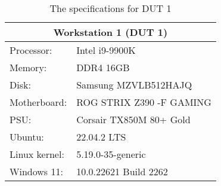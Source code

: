 \begin{table}[H]
    \centering
    \begin{tabular}{|| l | l ||}
    \hline
    \multicolumn{2}{||c||}{Workstation 1 (DUT 1)}    \\ [0.5ex] \hline\hline
    Processor:          & Intel i9-9900K                \\
    Memory:             & DDR4 16GB                     \\
    Disk:               & Samsung MZVLB512HAJQ \\
    Motherboard:        & ROG STRIX Z390 -F GAMING      \\
    PSU:                & Corsair TX850M 80+ Gold\\
    Ubuntu:             & 22.04.2 LTS        \\
    Linux kernel:       & 5.19.0-35-generic       \\
    Windows 11:         & 10.0.22621 Build 2262 \\ \hline
    \end{tabular}
    \caption{The specifications for DUT 1}
    \label{tab:DUT1}
\end{table}